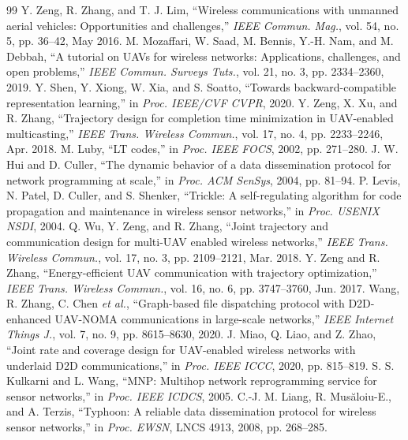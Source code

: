 \begin{thebibliography}{99}\footnotesize
{} Y. Zeng, R. Zhang, and T. J. Lim, ``Wireless communications with unmanned aerial vehicles:
Opportunities and challenges,'' \emph{IEEE Commun. Mag.}, vol. 54, no. 5, pp. 36--42, May 2016.
 M. Mozaffari, W. Saad, M. Bennis, Y.-H. Nam, and M. Debbah, ``A tutorial on UAVs for wireless
networks: Applications, challenges, and open problems,'' \emph{IEEE Commun. Surveys Tuts.}, vol. 21, no. 3,
pp. 2334--2360, 2019.
 Y. Shen, Y. Xiong, W. Xia, and S. Soatto, ``Towards backward-compatible representation learning,'' in
\emph{Proc. IEEE/CVF CVPR}, 2020.
 Y. Zeng, X. Xu, and R. Zhang, ``Trajectory design for completion time minimization in
UAV-enabled multicasting,'' \emph{IEEE Trans. Wireless Commun.}, vol. 17, no. 4, pp. 2233--2246, Apr. 2018.
 M. Luby, ``LT codes,'' in \emph{Proc. IEEE FOCS}, 2002, pp. 271--280.
 J. W. Hui and D. Culler, ``The dynamic behavior of a data dissemination protocol for network
programming at scale,'' in \emph{Proc. ACM SenSys}, 2004, pp. 81--94.
 P. Levis, N. Patel, D. Culler, and S. Shenker, ``Trickle: A self-regulating algorithm for code
propagation and maintenance in wireless sensor networks,'' in \emph{Proc. USENIX NSDI}, 2004.
 Q. Wu, Y. Zeng, and R. Zhang, ``Joint trajectory and communication design for multi-UAV enabled wireless
networks,'' \emph{IEEE Trans. Wireless Commun.}, vol. 17, no. 3, pp. 2109--2121, Mar. 2018.
 Y. Zeng and R. Zhang, ``Energy-efficient UAV communication with trajectory optimization,''
\emph{IEEE Trans. Wireless Commun.}, vol. 16, no. 6, pp. 3747--3760, Jun. 2017.
  Wang, R. Zhang, C. Chen \emph{et al.}, ``Graph-based file
dispatching protocol with D2D-enhanced UAV-NOMA communications in large-scale networks,'' \emph{IEEE Internet Things J.},
vol. 7, no. 9, pp. 8615--8630, 2020. 
 J. Miao, Q. Liao, and Z. Zhao, ``Joint rate and coverage design for UAV-enabled wireless networks with
underlaid D2D communications,'' in \emph{Proc. IEEE ICCC}, 2020, pp. 815--819.
 S. S. Kulkarni and L. Wang, ``MNP: Multihop network reprogramming service for sensor networks,''
in \emph{Proc. IEEE ICDCS}, 2005.
 C.-J. M. Liang, R. Mus\u{a}loiu-E., and A. Terzis, ``Typhoon: A reliable data dissemination
protocol for wireless sensor networks,'' in \emph{Proc. EWSN}, LNCS 4913, 2008, pp. 268--285.

\end{thebibliography}
